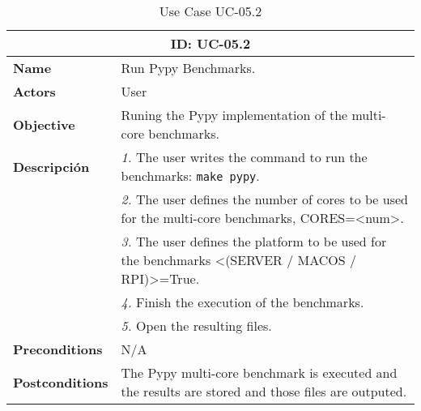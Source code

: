 \begin{table}[H]
    \centering
    \begin{tabular}{l p{10cm}}
        \toprule
        \multicolumn{2}{c}{\textbf{ID: UC-05.2}} \\
        \toprule
        \textbf{Name}                         &  Run Pypy Benchmarks. \\
        \textbf{Actors}                       &  User \\
        \textbf{Objective}                    &  Runing the Pypy implementation of the multi-core benchmarks. \\
        \multirow{1}{*}{\textbf{Descripción}} & \textsl{1.} The user writes the command to run the benchmarks: \texttt{make pypy}.\\
                                              & \textsl{2.} The user defines the number of cores to be used for the multi-core benchmarks, CORES=<num>.\\
                                              & \textsl{3.} The user defines the platform to be used for the benchmarks <(SERVER / MACOS / RPI)>=True.\\
                                              & \textsl{4.} Finish the execution of the benchmarks.\\
                                              & \textsl{5.} Open the resulting files.\\ 
        \textbf{Preconditions}                &  N/A \\
        \textbf{Postconditions}               &  The Pypy multi-core benchmark is executed and the results are stored and those files are outputed. \\
    \end{tabular}
    \caption{Use Case UC-05.2}
    \label{tab:uc-05.2}
\end{table}



